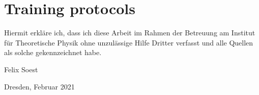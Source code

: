 \chapter{Training protocols}\label{training}


\clearpage
\thispagestyle{empty}
\vspace*{1.5em}

Hiermit erkläre ich, dass ich diese Arbeit im Rahmen der Betreuung am Institut
für Theoretische Physik ohne unzulässige Hilfe Dritter verfasst und alle Quellen als solche gekennzeichnet habe.

\vspace*{45em}

Felix Soest \par
Dresden, Februar 2021


